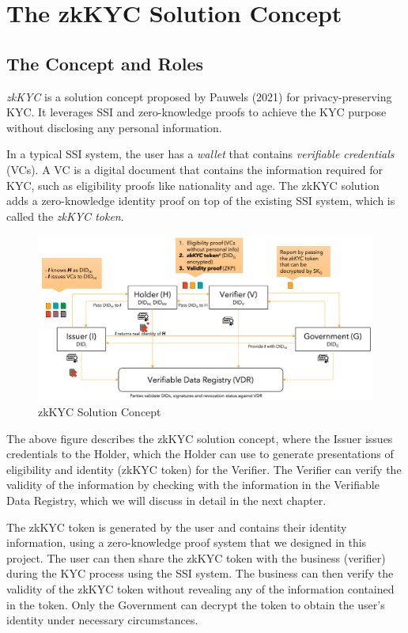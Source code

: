\documentclass[
]{report}
\begin{document}
\section{The zkKYC Solution Concept}

\subsection*{The Concept and Roles}
\emph{zkKYC} is a solution concept proposed by Pauwels (2021) for
privacy-preserving KYC. It leverages SSI and zero-knowledge proofs to
achieve the KYC purpose without disclosing any personal information.

In a typical SSI system, the user has a \emph{wallet} that contains
\emph{verifiable credentials} (VCs). A VC is a digital document
that contains the information required for KYC, such as eligibility
proofs like nationality and age. The zkKYC solution
adds a zero-knowledge identity proof on top of the existing SSI
system, which is called the \emph{zkKYC token}.

\begin{figure}
\centering
\includegraphics{zkkyc-system.png}
\caption{zkKYC Solution Concept}
\end{figure}

The above figure describes the zkKYC solution concept, where the Issuer
issues credentials to the Holder, which the Holder can use to generate
presentations of eligibility and identity (zkKYC token) for the Verifier.
The Verifier can verify the validity of the information by checking with
the information in the Verifiable Data Registry, which we will discuss
in detail in the next chapter.

The zkKYC token is generated by the user and contains their identity
information, using a zero-knowledge proof system that we designed in
this project. The user can then share the zkKYC token with the business
(verifier) during the KYC process using the SSI system. The business can
then verify the validity of the zkKYC token without revealing any of the
information contained in the token. Only the Government can decrypt the
token to obtain the user's identity under necessary circumstances.
\end{document}
